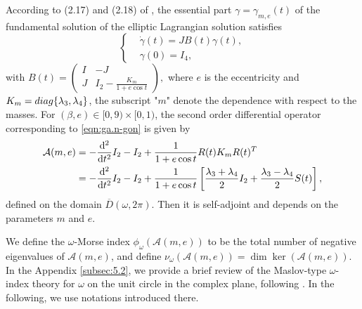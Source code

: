 \documentclass[11pt]{article}
\newtheorem{lemma}{Lemma}[section]
\def\nn{\nonumber}
\def\lb{\label}
\def\d{{\mathrm{d}}}
\def\U{{\bf U}}
\def\om{{\omega}}
\def\cA{{\cal A}}
\def\diag{{\rm diag}}
\def\ol#1{\overline{#1}}
\begin{document}
According to (2.17) and (2.18) of \cite{HLS}, the essential part $\gamma=\gamma_{m, e}(t)$ of the fundamental solution of the elliptic Lagrangian solution satisfies
\begin{equation}\label{eqn:ga.n-gon}
\begin{cases}
&\dot{\gamma}(t)=J B(t) \gamma(t), \\
&\gamma(0)=I_{4},
\end{cases}
\end{equation}
with
$B(t)=\left(\begin{smallmatrix}
I & -J \\
J & I_2 - \frac{K_{m}}{1+e\cos t}
\end{smallmatrix}\right),
$
where $e$ is the eccentricity and $K_{m}=\diag\{\lambda_3, \lambda_4\}$, the subscript "$m$" denote the dependence with respect to the masses.
 For $(\beta, e) \in[0,9) \times[0,1)$, the second order differential operator corresponding to \eqref{eqn:ga.n-gon} is given by
\begin{align}\lb{eqn:ca.n-gon}
  \cA(m, e) &= -\frac{\d^2}{\d t^2}I_2  -I_2 + \frac{1}{1+e\cos t}R(t)K_mR(t)^T \nn \\
  &= -\frac{\d^2}{\d t^2}I_2  -I_2 + \frac{1}{1+e\cos t}\left[
  \frac{\lambda_3 + \lambda_4}{2}I_2 
  + \frac{\lambda_3 - \lambda_4}{2} S(t)\right], 
\end{align}
defined on the domain $\ol{D}(\om,2\pi)$.
Then it is self-adjoint and depends on the parameters $m$ and $e$. 

We define the $\omega$-Morse index $\phi_{\omega}(\mathcal{A}(m,e))$ to be the total number of negative eigenvalues of $\mathcal{A}(m,e)$,
and define $\nu_{\omega}(\mathcal{A}(m,e))=\dim\ker(\mathcal{A}(m,e))$.
In the Appendix \ref{subsec:5.2}, we provide a brief review of the Maslov-type
$\omega$-index theory for $\omega$ on the unit circle in the complex plane,  following \cite{Lon4}.
In the following, we use notations introduced there.

\end{document}
